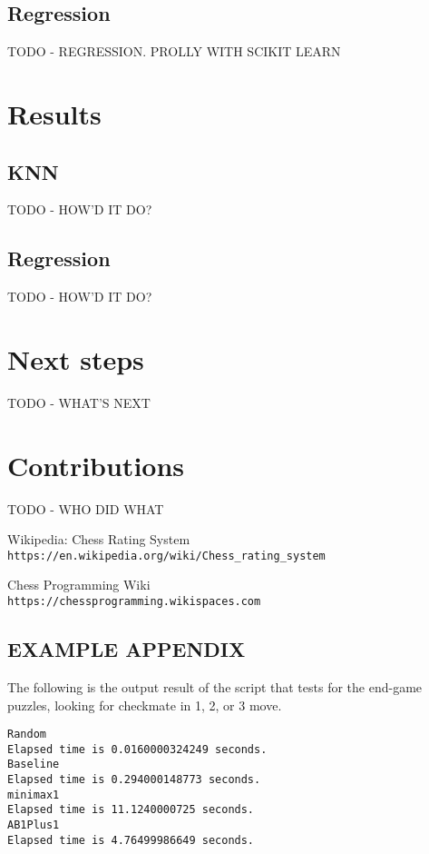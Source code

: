 \documentclass[10pt,journal,compsoc]{IEEEtran}
\begin{document}
\subsection{Regression}
TODO - REGRESSION. PROLLY WITH SCIKIT LEARN

\section{Results}

\subsection{KNN}
TODO - HOW'D IT DO?

\subsection{Regression}
TODO - HOW'D IT DO?

\section{Next steps}
TODO - WHAT'S NEXT

\section{Contributions}
TODO - WHO DID WHAT

\begin{thebibliography}{9}

Wikipedia: Chess Rating System
\\\texttt{https://en.wikipedia.org/wiki/Chess\_rating\_system}

Chess  Programming Wiki
\\\texttt{https://chessprogramming.wikispaces.com}
\end{thebibliography}

\begin{appendices}
\section{EXAMPLE APPENDIX}
The following is the output result of the script that tests for the end-game puzzles, looking for checkmate in 1, 2, or 3 move. \\

\lstset{
basicstyle=\small\ttfamily,
columns=flexible,
breaklines=true
}
\begin{lstlisting}
Random
Elapsed time is 0.0160000324249 seconds.
Baseline
Elapsed time is 0.294000148773 seconds.
minimax1
Elapsed time is 11.1240000725 seconds.
AB1Plus1
Elapsed time is 4.76499986649 seconds.
\end{lstlisting}
\end{appendices}

\end{document}
